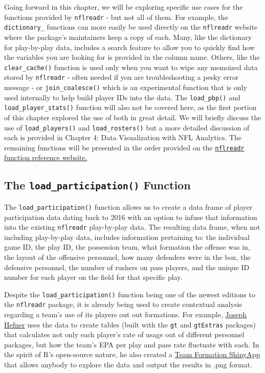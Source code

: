 \documentclass[
  letterpaper,
]{krantz}
\begin{document}
Going forward in this chapter, we will be exploring specific use cases
for the functions provided by \texttt{nflreadr} - but not all of them.
For example, the \texttt{dictionary\_} functions can more easily be used
directly on the \texttt{nflreadr} website where the package's
maintainers keep a copy of each. Many, like the dictionary for
play-by-play data, includes a search feature to allow you to quickly
find how the variables you are looking for is provided in the column
name. Others, like the \texttt{clear\_cache()} function is used only
when you want to wipe any memoized data stored by \texttt{nflreadr} -
often needed if you are troubleshooting a pesky error message - or
\texttt{join\_coalesce()} which is an experimental function that is only
used internally to help build player IDs into the data. The
\texttt{load\_pbp()} and \texttt{load\_player\_stats()} function will
also not be covered here, as the first portion of this chapter explored
the use of both in great detail. We will briefly discuss the use of
\texttt{load\_players()} and \texttt{load\_rosters()} but a more
detailed discussion of each is provided in Chapter 4: Data Visualization
with NFL Analytics. The remaining functions will be presented in the
order provided on the
\href{https://nflreadr.nflverse.com/reference/index.html}{\texttt{nflreadr}
function reference website.}

\hypertarget{the-load_participation-function}{%
\subsection{\texorpdfstring{The \texttt{load\_participation()}
Function}{The load\_participation() Function}}\label{the-load_participation-function}}

The \texttt{load\_participation()} function allows us to create a data
frame of player participation data dating back to 2016 with an option to
infuse that information into the existing \texttt{nflreadr} play-by-play
data. The resulting data frame, when not including play-by-play data,
includes information pertaining to: the individual game ID, the play ID,
the possession team, what formation the offense was in, the layout of
the offensive personnel, how many defenders were in the box, the
defensive personnel, the number of rushers on pass players, and the
unique ID number for each player on the field for that specific play.

Despite the \texttt{load\_participation()} function being one of the
newest editions to the \texttt{nflreadr} package, it is already being
used to create contextual analysis regarding a team's use of its players
out out formations. For example,
\href{https://twitter.com/josephjefe}{Joseph Hefner} uses the data to
create tables (built with the \texttt{gt} and \texttt{gtExtras}
packages) that calculates not only each player's rate of usage out of
different personnel packages, but how the team's EPA per play and pass
rate fluctuate with each. In the spirit of R's open-source nature, he
also created a
\href{https://josephjefe.shinyapps.io/formations_app/}{Team Formation
ShinyApp} that allows anybody to explore the data and output the results
in .png format.
\end{document}
